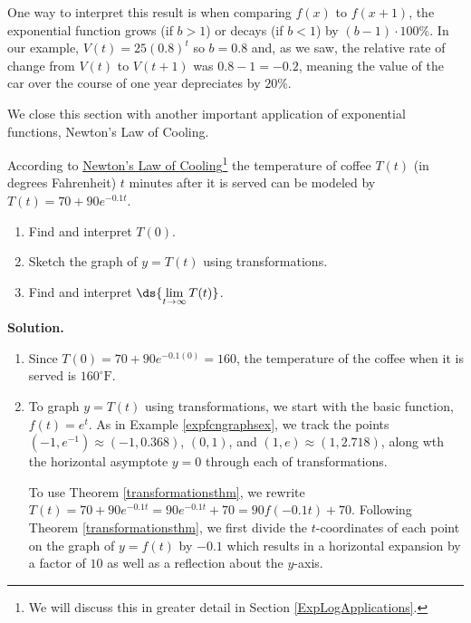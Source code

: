 \documentclass{ximera}
\begin{document}
{One way to interpret this result is when comparing $f(x)$ to $f(x+1)$, the exponential function grows (if $b>1$) or decays (if $b<1$) by $(b-1) \cdot 100 \%$.  In our example, $V(t) = 25 (0.8)^{t}$ so $b = 0.8$ and, as we saw, the relative rate of change from $V(t)$ to $V(t+1)$ was $ 0.8 - 1= -0.2$, meaning the value of the car  over the course of one year depreciates by  $20 \%$.

\smallskip

We close this section with another important application of exponential functions,  Newton's Law of Cooling.

\smallskip

\begin{example}  \label{exptempex} According to \href{http://en.wikipedia.org/wiki/Heat_transfer#Newton.27s_law_of_cooling}{\underline{Newton's Law of Cooling}}\footnote{We will discuss this in greater detail in Section \ref{ExpLogApplications}.} the temperature of coffee $T(t)$ (in degrees Fahrenheit) $t$ minutes after it is served can be modeled by $T(t) = 70 + 90 e^{-0.1 t}$. 

\begin{enumerate}

\item  Find and interpret $T(0)$.

\item  Sketch the graph of $y = T(t)$ using transformations.

\item  Find and interpret $\ds{\lim_{t \rightarrow \infty} T(t)}$.  

\end{enumerate}

{\bf Solution.}

\begin{enumerate}

\item  Since $T(0) =70 + 90 e^{-0.1 (0)} = 160$,   the temperature of the coffee when it is served is $160^{\circ}\mbox{F}$.

\item  To graph $y = T(t)$ using transformations, we start with the basic function, $f(t)=e^{t}$.  As in Example \ref{expfcngraphsex}, we track the points $(-1, e^{-1}) \approx (-1, 0.368)$, $(0,1)$, and $(1, e) \approx (1, 2.718)$, along wth the horizontal asymptote $y = 0$ through each of transformations.

\smallskip

To use Theorem  \ref{transformationsthm}, we rewrite   $T(t) = 70 + 90e^{-0.1t} = 90e^{-0.1t}+70 = 90 f(-0.1t)+70$.   Following Theorem  \ref{transformationsthm}, we first  divide the $t$-coordinates of each point on the graph of $y=f(t)$ by $-0.1$ which results in a horizontal expansion by a factor of $10$ as well as a reflection about the $y$-axis.  


\end{enumerate}
\end{example}}
\end{document}
